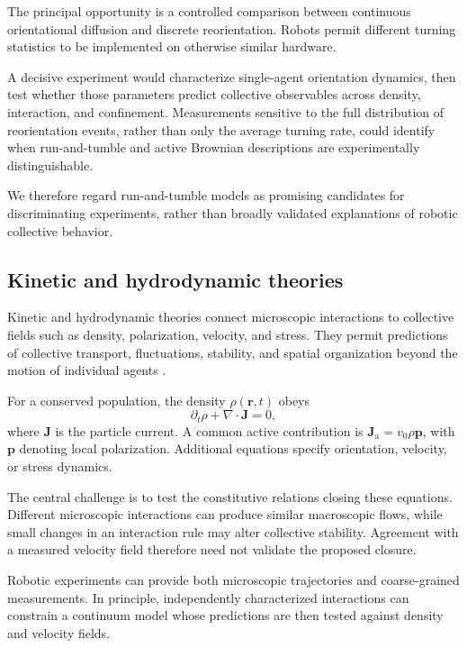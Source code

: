 The principal opportunity is a
controlled comparison between
continuous orientational diffusion
and discrete reorientation.
Robots permit different turning
statistics to be implemented
on otherwise similar hardware.

A decisive experiment would
characterize single-agent orientation
dynamics, then test whether those
parameters predict collective
observables across density,
interaction, and confinement.
Measurements sensitive to the
full distribution of reorientation
events, rather than only the
average turning rate, could
identify when run-and-tumble
and active Brownian descriptions
are experimentally distinguishable.

We therefore regard run-and-tumble
models as promising candidates
for discriminating experiments,
rather than broadly validated
explanations of robotic
collective behavior.

\subsection{Kinetic and hydrodynamic theories}
\label{sec:theory-kinetic}

Kinetic and hydrodynamic theories connect microscopic
interactions to collective fields such as density,
polarization, velocity, and stress. They permit
predictions of collective transport, fluctuations,
stability, and spatial organization beyond the
motion of individual agents
\cite{Toner1995longrange,Marchetti2013hydrodynamics}.

For a conserved population, the density
$\rho(\mathbf r,t)$ obeys
\begin{equation}
\partial_t\rho+
\nabla\cdot\mathbf J=0,
\label{eq:theory-continuity}
\end{equation}
where $\mathbf J$ is the particle current.
A common active contribution is
$\mathbf J_{\mathrm a}=v_0\rho\mathbf p$,
with $\mathbf p$ denoting local polarization.
Additional equations specify orientation,
velocity, or stress dynamics.

The central challenge is to test the constitutive
relations closing these equations. Different
microscopic interactions can produce similar
macroscopic flows, while small changes in an
interaction rule may alter collective stability.
Agreement with a measured velocity field
therefore need not validate the proposed closure.

Robotic experiments can provide both microscopic
trajectories and coarse-grained measurements.
In principle, independently characterized
interactions can constrain a continuum model
whose predictions are then tested against
density and velocity fields.

